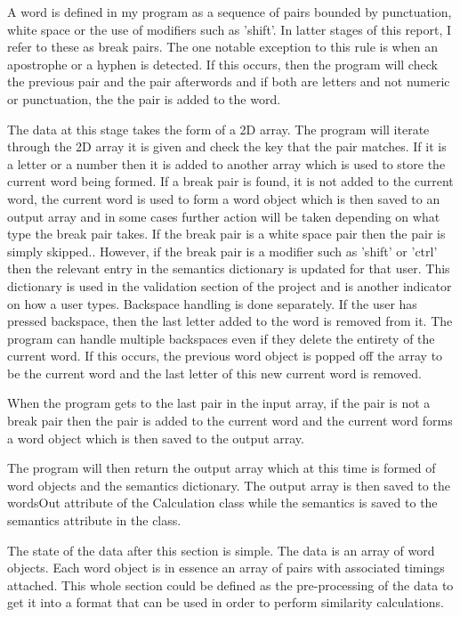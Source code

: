 \documentclass[10pt,a4paper]{report}
\begin{document}
A word is defined in my program as a sequence of pairs bounded by punctuation, white space or the use of modifiers such as 'shift'. In latter stages of this report, I refer to these as break pairs. The one notable exception to this rule is when an apostrophe or a hyphen is detected. If this occurs, then the program will check the previous pair and the pair afterwords and if both are letters and not numeric or punctuation, the the pair is added to the word. 

The data at this stage takes the form of a 2D array. The program will iterate through the 2D array it is given and check the key that the pair matches. If it is a letter or a number then it is added to another array which is used to store the current word being formed. If a break pair is found, it is not added to the current word, the current word is used to form a word object which is then saved to an output array and in some cases further action will be taken depending on what type the break pair takes. If the break pair is a white space pair then the pair is simply skipped.. However, if the break pair is a modifier such as 'shift' or 'ctrl' then the relevant entry in the semantics dictionary is updated for that user. This dictionary is used in the validation section of the project and is another indicator on how a user types. Backspace handling is done separately. If the user has pressed backspace, then the last letter added to the word is removed from it. The program can handle multiple backspaces even if they delete the entirety of the current word. If this occurs, the previous word object is popped off the array to be the current word and the last letter of this new current word is removed.

When the program gets to the last pair in the input array, if the pair is not a break pair then the pair is added to the current word and the current word forms a word object which is then saved to the output array.

The program will then return the output array which at this time is formed of word objects and the semantics dictionary. The output array is then saved to the wordsOut attribute of the Calculation class while the semantics is saved to the semantics attribute in the class.

The state of the data after this section is simple. The data is an array of word objects. Each word object is in essence an array of pairs with associated timings attached. This whole section could be defined as the pre-processing of the data to get it into a format that can be used in order to perform similarity calculations.
\end{document}
